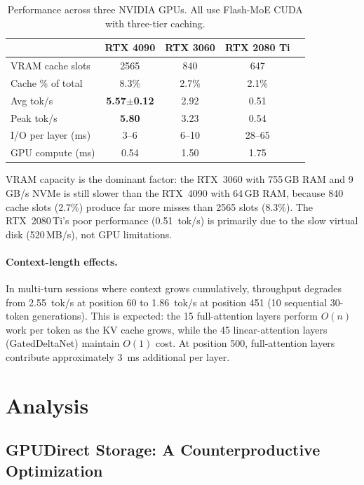 \documentclass[10pt]{article}
\begin{document}
\begin{table}[h]
\centering
\small
\caption{Performance across three NVIDIA GPUs. All use Flash-MoE CUDA with three-tier caching.}
\label{tab:multi}
\begin{tabular}{lcccc}
\toprule
& \textbf{RTX 4090} & \textbf{RTX 3060} & \textbf{RTX 2080 Ti} \\
\midrule
VRAM cache slots & 2565 & 840 & 647 \\
Cache \% of total & 8.3\% & 2.7\% & 2.1\% \\
Avg tok/s & \textbf{5.57$\pm$0.12} & 2.92 & 0.51 \\
Peak tok/s & \textbf{5.80} & 3.23 & 0.54 \\
I/O per layer (ms) & 3--6 & 6--10 & 28--65 \\
GPU compute (ms) & 0.54 & 1.50 & 1.75 \\
\bottomrule
\end{tabular}
\end{table}

VRAM capacity is the dominant factor: the RTX~3060 with 755\,GB RAM and 9\,GB/s NVMe is still slower than the RTX~4090 with 64\,GB RAM, because 840 cache slots (2.7\%) produce far more misses than 2565 slots (8.3\%). The RTX~2080\,Ti's poor performance (0.51~tok/s) is primarily due to the slow virtual disk (520\,MB/s), not GPU limitations.

\paragraph{Context-length effects.} In multi-turn sessions where context grows cumulatively, throughput degrades from 2.55~tok/s at position 60 to 1.86~tok/s at position 451 (10 sequential 30-token generations). This is expected: the 15 full-attention layers perform $O(n)$ work per token as the KV cache grows, while the 45 linear-attention layers (GatedDeltaNet) maintain $O(1)$ cost. At position 500, full-attention layers contribute approximately 3~ms additional per layer.

\section{Analysis}

\subsection{GPUDirect Storage: A Counterproductive Optimization}
\label{sec:gds}
\end{document}
